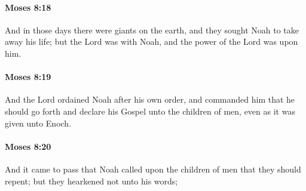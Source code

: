 		\paragraph{Moses 8:18} %
			\label{MOSES-8-18}

			And in those days there were giants on the earth, and they sought Noah to take away his life; but the Lord was with Noah, and the power of the Lord was upon him.


		\paragraph{Moses 8:19} %
			\label{MOSES-8-19}

			And the Lord ordained Noah after his own order, and commanded him that he should go forth and declare his Gospel unto the children of men, even as it was given unto Enoch.


		\paragraph{Moses 8:20} %
			\label{MOSES-8-20}

			And it came to pass that Noah called upon the children of men that they should repent; but they hearkened not unto his words;



